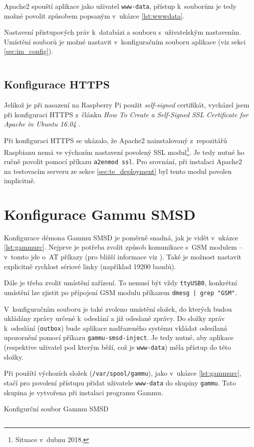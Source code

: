 Apache2 spouští aplikace jako uživatel \texttt{www-data}, přístup k~souborům je tedy možné povolit způsobem popsaným v~ukázce \ref{lst:wwwdata}.

\begin{listing}[htbp]
\caption{\label{lst:wwwdata} Nastavení přistupových práv k~databázi a souboru s~uživatelským nastavením. Umístění souborů je možné nastavit v~konfiguračním souboru aplikace (viz sekci \ref{sec:im_config}).}
\inputminted[bgcolor=codebg]{bash}{source-samples/wwwdata.sh}
\end{listing}

\subsection{Konfigurace HTTPS}

Jelikož je při nasazení na Raspberry Pi použit \textit{self-signed} certifikát, vycházel jsem při konfiguraci HTTPS z~článku \textit{How To Create a Self-Signed SSL Certificate for Apache in Ubuntu 16.04} \cite{digital_ocean_selfsigned}.

Při konfiguraci HTTPS se ukázalo, že Apache2 nainstalovaný z~repozitářů Raspbianu nemá ve výchozím nastavení povolený SSL modul\footnote{Situace v~dubnu 2018.}. Je tedy nutné ho ručně povolit pomocí příkazu \texttt{a2enmod ssl}. Pro srovnání, při instalaci Apache2 na testovacím serveru ze sekce \ref{sec:te_deployment} byl tento modul povolen implicitně.

\section{Konfigurace Gammu SMSD}

Konfigurace démona Gammu SMSD je poměrně snadná, jak je vidět v~ukázce \ref{lst:gammurc}. Nejprve je potřeba zvolit způsob komunikace s~GSM modulem -- v~tomto jde o~AT příkazy (pro bližší informace viz \cite{gsm_standard}). Také je možnost nastavit explicitně rychlost sériové linky (například 19200 baudů).

Dále je třeba zvolit umístění zařízení. To nemusí být vždy \texttt{ttyUSB0}, konkrétní umístění lze zjistit po přípojení GSM modulu příkazem \texttt{dmesg | grep "GSM"}.

V~konfiguračním souboru je také zvoleno umístění složek, do kterých budou ukládány zprávy určené k~odeslání a již odeslané zprávy. Do složky zpráv k~odeslání (\texttt{outbox}) bude aplikace nadřazeného systému vkládat odesílaná upozornění pomocí příkazu \texttt{gammu-smsd-inject}. Je tedy nutné, aby aplikace (respektive uživatel pod kterým běží, což je \texttt{www-data}) měla přístup do této složky.

Při použítí výchozích složek (\texttt{/var/spool/gammu}), jako v~ukázce \ref{lst:gammurc}, stačí pro povolení přístupu přidat uživatele \texttt{www-data} do skupiny \texttt{gammu}. Tato skupina je vytvořena při instalaci programu Gammu.

\begin{listing}[htbp]
\caption{\label{lst:gammurc} Konfigurční soubor Gammu SMSD}
\inputminted[bgcolor=codebg]{ini}{source-samples/gammurc}
\end{listing}
